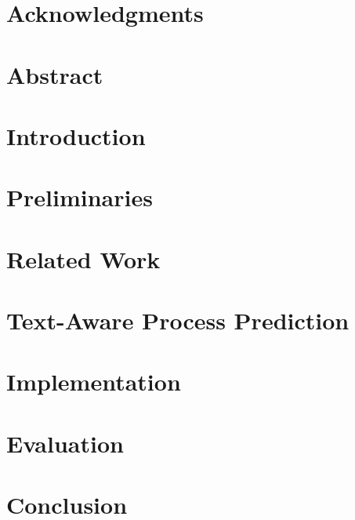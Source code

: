 \documentclass[a4paper,
11pt,
openright,
cleardoublepage=empty,
twoside
]{pads-thesis}
\begin{document}


\gTitlePage

\chapter*{Acknowledgments} %


\chapter*{Abstract}%


\pagestyle{plain}
\tableofcontents

\listoffigures {}

\listoftables {}


\cleardoublepage
\pagestyle{fancy}

\chapter{Introduction} \label{chap:intro}


\chapter{Preliminaries} \label{chap:prelim}


\chapter{Related Work} \label{chap:related_work}


\chapter{Text-Aware Process Prediction} \label{chap:concept}


\chapter{Implementation} \label{chap:impl}


\chapter{Evaluation} \label{chap:eval}


\chapter{Conclusion} \label{chap:conclusion}


\end{document}
